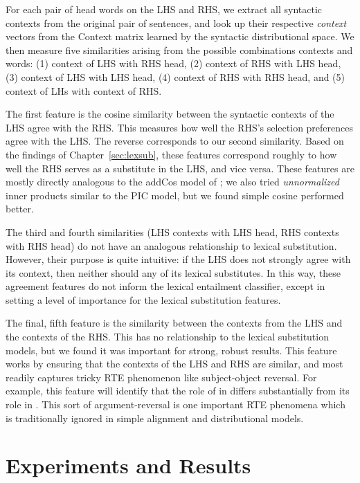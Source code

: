 For each pair of head words on the LHS and RHS, we extract all syntactic
contexts from the original pair of sentences, and look up their respective {\em
context} vectors from the Context matrix learned by the syntactic
distributional space. We then measure five similarities arising
from the possible combinations contexts and words:
(1) context of LHS with RHS head, (2) context of RHS with LHS head,
(3) context of LHS with LHS head, (4) context of RHS with RHS head, and
(5) context of LHs with context of RHS.

The first feature is the cosine similarity between the syntactic contexts of
the LHS agree with the RHS. This measures how well the RHS's selection
preferences agree with the LHS. The reverse corresponds to our
second similarity. Based on the findings of Chapter~\ref{sec:lexsub}, these
features correspond roughly to how well the RHS serves as a substitute in
the LHS, and vice versa. These features are mostly directly analogous to the
addCos model of ; we also tried {\em unnormalized}
inner products similar to the PIC model, but we found simple cosine performed
better.

The third and fourth similarities (LHS contexts with LHS head, RHS contexts
with RHS head) do not have an analogous relationship to lexical substitution.
However, their purpose is quite intuitive: if the LHS does not strongly agree
with its context, then neither should any of its lexical substitutes. In this
way, these agreement features do not inform the lexical entailment
classifier, except in setting a level of importance for the lexical substitution
features.

The final, fifth feature is the similarity between the contexts from the LHS
and the contexts of the RHS. This has no relationship to the lexical
substitution models, but we found it was important for strong, robust results.
This feature works by ensuring that the contexts of the LHS and RHS are
similar, and most readily captures tricky RTE phenomenon like subject-object
reversal.  For example, this feature will identify that the role of 
in  differs substantially from its role in . This sort of argument-reversal is one important RTE phenomena which
is traditionally ignored in simple alignment and distributional models.

\section{Experiments and Results}


